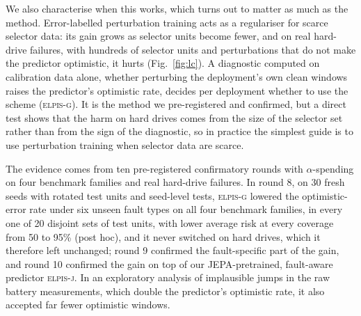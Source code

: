 \documentclass{esannV2}
\newcommand{\AUTOD}{\textsc{elpis-g}}
\newcommand{\EJ}{\textsc{elpis-j}}
\begin{document}
We also characterise when this works, which turns out to matter as much as the method. Error-labelled perturbation training acts as a regulariser for scarce selector data: its gain grows as selector units become fewer, and on real hard-drive failures, with hundreds of selector units and perturbations that do not make the predictor optimistic, it hurts (Fig.~\ref{fig:lc}). A diagnostic computed on calibration data alone, whether perturbing the deployment's own clean windows raises the predictor's optimistic rate, decides per deployment whether to use the scheme (\AUTOD). It is the method we pre-registered and confirmed, but a direct test shows that the harm on hard drives comes from the size of the selector set rather than from the sign of the diagnostic, so in practice the simplest guide is to use perturbation training when selector data are scarce.

The evidence comes from ten pre-registered confirmatory rounds with $\alpha$-spending on four benchmark families and real hard-drive failures. In round 8, on 30 fresh seeds with rotated test units and seed-level tests, \AUTOD{} lowered the optimistic-error rate under six unseen fault types on all four benchmark families, in every one of 20 disjoint sets of test units, with lower average risk at every coverage from 50 to 95\% (post hoc), and it never switched on hard drives, which it therefore left unchanged; round 9 confirmed the fault-specific part of the gain, and round 10 confirmed the gain on top of our JEPA-pretrained, fault-aware predictor \EJ. In an exploratory analysis of implausible jumps in the raw battery measurements, which double the predictor's optimistic rate, it also accepted far fewer optimistic windows.
\end{document}
